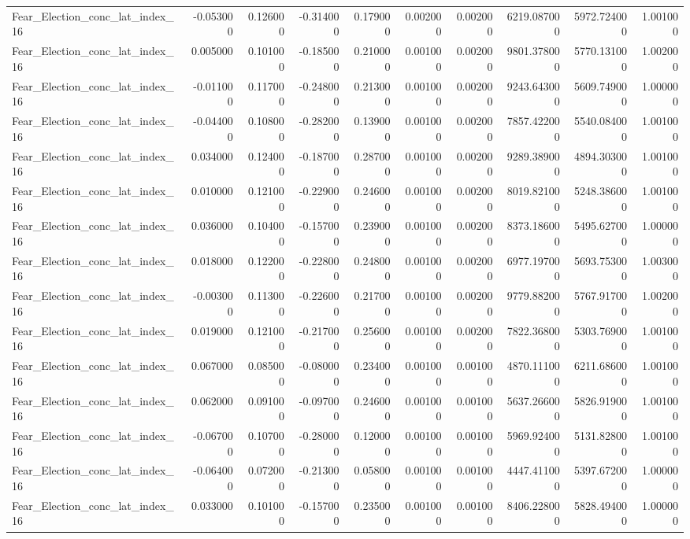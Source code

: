 \begin{table}
\begin{tabular}{lrrrrrrrrr}
Fear_Election_conc_lat_index_16 & -0.053000 & 0.126000 & -0.314000 & 0.179000 & 0.002000 & 0.002000 & 6219.087000 & 5972.724000 & 1.001000 \\
Fear_Election_conc_lat_index_16 & 0.005000 & 0.101000 & -0.185000 & 0.210000 & 0.001000 & 0.002000 & 9801.378000 & 5770.131000 & 1.002000 \\
Fear_Election_conc_lat_index_16 & -0.011000 & 0.117000 & -0.248000 & 0.213000 & 0.001000 & 0.002000 & 9243.643000 & 5609.749000 & 1.000000 \\
Fear_Election_conc_lat_index_16 & -0.044000 & 0.108000 & -0.282000 & 0.139000 & 0.001000 & 0.002000 & 7857.422000 & 5540.084000 & 1.001000 \\
Fear_Election_conc_lat_index_16 & 0.034000 & 0.124000 & -0.187000 & 0.287000 & 0.001000 & 0.002000 & 9289.389000 & 4894.303000 & 1.001000 \\
Fear_Election_conc_lat_index_16 & 0.010000 & 0.121000 & -0.229000 & 0.246000 & 0.001000 & 0.002000 & 8019.821000 & 5248.386000 & 1.001000 \\
Fear_Election_conc_lat_index_16 & 0.036000 & 0.104000 & -0.157000 & 0.239000 & 0.001000 & 0.002000 & 8373.186000 & 5495.627000 & 1.000000 \\
Fear_Election_conc_lat_index_16 & 0.018000 & 0.122000 & -0.228000 & 0.248000 & 0.001000 & 0.002000 & 6977.197000 & 5693.753000 & 1.003000 \\
Fear_Election_conc_lat_index_16 & -0.003000 & 0.113000 & -0.226000 & 0.217000 & 0.001000 & 0.002000 & 9779.882000 & 5767.917000 & 1.002000 \\
Fear_Election_conc_lat_index_16 & 0.019000 & 0.121000 & -0.217000 & 0.256000 & 0.001000 & 0.002000 & 7822.368000 & 5303.769000 & 1.001000 \\
Fear_Election_conc_lat_index_16 & 0.067000 & 0.085000 & -0.080000 & 0.234000 & 0.001000 & 0.001000 & 4870.111000 & 6211.686000 & 1.001000 \\
Fear_Election_conc_lat_index_16 & 0.062000 & 0.091000 & -0.097000 & 0.246000 & 0.001000 & 0.001000 & 5637.266000 & 5826.919000 & 1.001000 \\
Fear_Election_conc_lat_index_16 & -0.067000 & 0.107000 & -0.280000 & 0.120000 & 0.001000 & 0.001000 & 5969.924000 & 5131.828000 & 1.001000 \\
Fear_Election_conc_lat_index_16 & -0.064000 & 0.072000 & -0.213000 & 0.058000 & 0.001000 & 0.001000 & 4447.411000 & 5397.672000 & 1.000000 \\
Fear_Election_conc_lat_index_16 & 0.033000 & 0.101000 & -0.157000 & 0.235000 & 0.001000 & 0.001000 & 8406.228000 & 5828.494000 & 1.000000 \\

\end{tabular}
\end{table}

